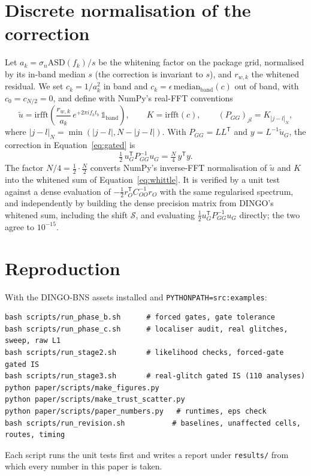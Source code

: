 \documentclass{openjournal}
\newcommand{\DINGOBNS}{DINGO-BNS\xspace}
\newcommand{\tp}{^{\mathsf{T}}}
\newif\ifstagethreeb
\begin{document}
\appendix
\section{Discrete normalisation of the correction}
\label{app:norm}

Let $a_k=\sigma_n\mathrm{ASD}(f_k)/s$ be the whitening factor on the package grid, normalised by its in-band median $s$ (the correction is invariant to $s$), and $r_{w,k}$ the whitened residual.
We set $c_k = 1/a_k^2$ in band and $c_k=\epsilon\,\mathrm{median}_{\mathrm{band}}(c)$ out of band, with $c_0=c_{N/2}=0$, and define with NumPy's real-FFT conventions
\begin{equation}
\tilde u = \mathrm{irfft}\!\left(\frac{r_{w,k}}{a_k}\, e^{+2\pi i f_k t_b}\,\mathbb{1}_{\mathrm{band}}\right),
\qquad
K = \mathrm{irfft}(c), \qquad (P_{GG})_{jl} = K_{|j-l|_N},
\end{equation}
where $|j-l|_N=\min(|j-l|,N-|j-l|)$.
With $P_{GG}=LL\tp$ and $y=L^{-1}\tilde u_G$, the correction in Equation~\eqref{eq:gated} is
\begin{equation}
\tfrac12\, u_G\tp P_{GG}^{-1}u_G = \tfrac{N}{4}\, y\tp y .
\end{equation}
The factor $N/4=\tfrac12\cdot\tfrac N2$ converts NumPy's inverse-FFT normalisation of $\tilde u$ and $K$ into the whitened sum of Equation~\eqref{eq:whittle}.
It is verified by a unit test against a dense evaluation of $-\tfrac12 r_O\tp C_{OO}^{-1} r_O$ with the same regularised spectrum, and independently by building the dense precision matrix from DINGO's whitened sum, including the shift $\mathcal{S}$, and evaluating $\tfrac12 u_G\tp P_{GG}^{-1}u_G$ directly; the two agree to $10^{-15}$.

\section{Reproduction}
\label{app:repro}
With the \DINGOBNS assets installed and \texttt{PYTHONPATH=src:examples}:
\begin{verbatim}
bash scripts/run_phase_b.sh      # forced gates, gate tolerance
bash scripts/run_phase_c.sh      # localiser audit, real glitches, sweep, raw L1
bash scripts/run_stage2.sh       # likelihood checks, forced-gate gated IS
bash scripts/run_stage3.sh       # real-glitch gated IS (110 analyses)
python paper/scripts/make_figures.py
python paper/scripts/make_trust_scatter.py
python paper/scripts/paper_numbers.py   # runtimes, eps check
bash scripts/run_revision.sh           # baselines, unaffected cells, routes, timing
\end{verbatim}
\ifstagethreeb
The follow-up run of Section~\ref{sec:real} is \texttt{bash scripts/run\_stage3b.sh}.
\fi
Each script runs the unit tests first and writes a report under \texttt{results/} from which every number in this paper is taken.



\end{document}
